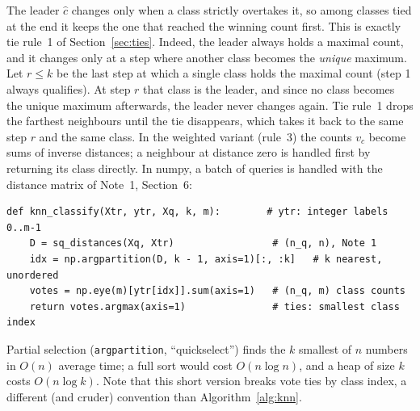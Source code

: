 \documentclass[11pt]{article}
\begin{document}
The leader $\hat c$ changes only when a class strictly overtakes it, so among classes tied at the end it keeps the one
that reached the winning count first. This is exactly tie rule~1 of Section~\ref{sec:ties}. Indeed, the leader always
holds a maximal count, and it changes only at a step where another class becomes the \emph{unique} maximum. Let
$r \le k$ be the last step at which a single class holds the maximal count (step 1 always qualifies). At step $r$ that
class is the leader, and since no class becomes the unique maximum afterwards, the leader never changes again. Tie
rule~1 drops the farthest neighbours until the tie disappears, which takes it back to the same step $r$ and the same
class. In the weighted variant (rule~3) the counts $v_c$ become sums of inverse distances; a neighbour at distance
zero is handled first by returning its class directly. In numpy, a batch of queries is handled with the distance matrix of
Note~1, Section~6:

\noindent\begin{minipage}{\linewidth}
\begin{verbatim}
def knn_classify(Xtr, ytr, Xq, k, m):        # ytr: integer labels 0..m-1
    D = sq_distances(Xq, Xtr)                 # (n_q, n), Note 1
    idx = np.argpartition(D, k - 1, axis=1)[:, :k]   # k nearest, unordered
    votes = np.eye(m)[ytr[idx]].sum(axis=1)   # (n_q, m) class counts
    return votes.argmax(axis=1)               # ties: smallest class index
\end{verbatim}
\end{minipage}

Partial selection (\texttt{argpartition}, ``quickselect'') finds the $k$ smallest of $n$ numbers in $O(n)$ average
time; a full sort would cost $O(n \log n)$, and a heap of size $k$ costs $O(n \log k)$. Note that this short version
breaks vote ties by class index, a different (and cruder) convention than Algorithm~\ref{alg:knn}.
\end{document}
